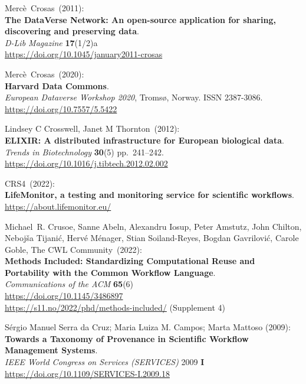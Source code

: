 \begin{thebibliography}{9}
Mercè~Crosas~(2011): \\
\textbf{The DataVerse Network: An open-source application for sharing,
discovering and preserving data}.\\
\emph{D-Lib Magazine} \textbf{17}(1/2)a\\
\url{https://doi.org/10.1045/january2011-crosas}

Mercè~Crosas~(2020): \\
\textbf{Harvard Data Commons}.\\
\emph{European Dataverse Workshop 2020}, Tromsø, Norway. ISSN
2387-3086.\\
\url{https://doi.org/10.7557/5.5422}

Lindsey C Crosswell, Janet M Thornton~(2012): \\
\textbf{ELIXIR: A distributed infrastructure for European biological
data}.\\
\emph{Trends in Biotechnology} \textbf{30}(5) pp.~241--242.\\
\url{https://doi.org/10.1016/j.tibtech.2012.02.002}

CRS4~(2022): \\
\textbf{LifeMonitor, a testing and monitoring service for scientific
workflows}.\\
\url{https://about.lifemonitor.eu/}

Michael~R. Crusoe, Sanne Abeln, Alexandru Iosup, Peter
Amstutz, John Chilton, Nebojša Tijanić, Hervé Ménager, Stian
Soiland-Reyes, Bogdan Gavrilović, Carole Goble, The CWL Community~(2022): \\
\textbf{Methods Included: Standardizing
Computational Reuse and Portability with the Common Workflow
Language}.\\
\emph{Communications of the ACM} \textbf{65}(6)\\
\url{https://doi.org/10.1145/3486897} \\
\url{https://s11.no/2022/phd/methods-included/} (Supplement 4)

Sérgio Manuel Serra da Cruz; Maria Luiza M. Campos; Marta Mattoso (2009):\\
\textbf{Towards a Taxonomy of Provenance in Scientific Workflow Management Systems}.\\
\emph{IEEE World Congress on Services (SERVICES)} 2009 \textbf{I}\\
\url{https://doi.org/10.1109/SERVICES-I.2009.18}


\end{thebibliography}
